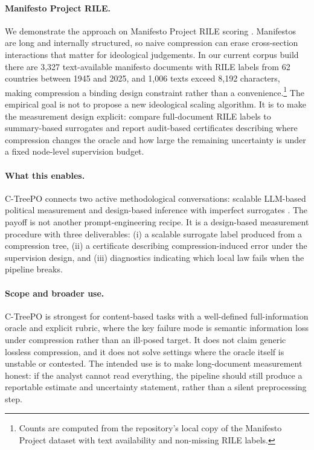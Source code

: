 \documentclass[11pt]{article}
\begin{document}
\paragraph{Manifesto Project RILE.}
We demonstrate the approach on Manifesto Project RILE scoring \citep{ManifestoProject2025a}. Manifestos are long and internally structured, so naive compression can erase cross-section interactions that matter for ideological judgements. In our current corpus build there are 3{,}327 text-available manifesto documents with RILE labels from 62 countries between 1945 and 2025, and 1{,}006 texts exceed 8{,}192 characters, making compression a binding design constraint rather than a convenience.\footnote{Counts are computed from the repository's local copy of the Manifesto Project dataset with text availability and non-missing RILE labels.} The empirical goal is not to propose a new ideological scaling algorithm. It is to make the measurement design explicit: compare full-document RILE labels to summary-based surrogates and report audit-based certificates describing where compression changes the oracle and how large the remaining uncertainty is under a fixed node-level supervision budget.

\paragraph{What this enables.}
C-TreePO connects two active methodological conversations: scalable LLM-based political measurement \citep{BenoitEtAl2025} and design-based inference with imperfect surrogates \citep{EgamiEtAl2024}. The payoff is not another prompt-engineering recipe. It is a design-based measurement procedure with three deliverables: (i) a scalable surrogate label produced from a compression tree, (ii) a certificate describing compression-induced error under the supervision design, and (iii) diagnostics indicating which local law fails when the pipeline breaks.

\paragraph{Scope and broader use.}
C-TreePO is strongest for content-based tasks with a well-defined full-information oracle and explicit rubric, where the key failure mode is semantic information loss under compression rather than an ill-posed target. It does not claim generic lossless compression, and it does not solve settings where the oracle itself is unstable or contested. The intended use is to make long-document measurement honest: if the analyst cannot read everything, the pipeline should still produce a reportable estimate and uncertainty statement, rather than a silent preprocessing step.
\end{document}
